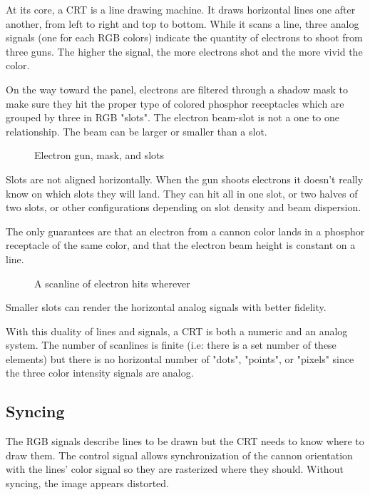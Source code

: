 At its core, a CRT is a line drawing machine. It draws horizontal lines one after another, from left to right and top to bottom. While it scans a line, three analog signals (one for each RGB colors) indicate the quantity of electrons to shoot from three guns. The higher the signal, the more electrons shot and the more vivid the color.


On the way toward the panel, electrons are filtered through a shadow mask to make sure they hit the proper type of colored phosphor receptacles which are grouped by three in RGB "slots". The electron beam-slot is not a one to one relationship. The beam can be larger or smaller than a slot.


\begin{figure}[H]
\caption*{Electron gun, mask, and slots}
\end{figure}

Slots are not aligned horizontally. When the gun shoots electrons it doesn't really know on which slots they will land. They can hit all in one slot, or two halves of two slots, or other configurations depending on slot density and beam dispersion. 

The only guarantees are that an electron from a cannon color lands in a phosphor receptacle of the same color, and that the electron beam height is constant on a line.

\begin{figure}[H]
\caption*{A scanline of electron hits wherever}
\end{figure}

Smaller slots can render the horizontal analog signals with better fidelity.





 With this duality of lines and signals, a CRT is both a numeric and an analog system. The number of scanlines is finite (i.e: there is a set number of these elements) but there is no horizontal number of "dots", "points", or "pixels" since the three color intensity signals are analog.


\subsection{Syncing}
The RGB signals describe lines to be drawn but the CRT needs to know where to draw them. The control signal allows synchronization of the cannon orientation with the lines' color signal so they are rasterized where they should. Without syncing, the image appears distorted. 

